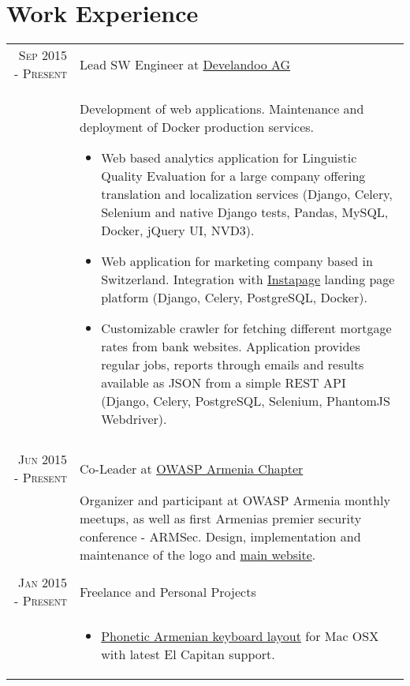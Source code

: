 \documentclass[a4paper,10pt]{article}
\begin{document}
\section{Work Experience}
\begin{tabular}{r|p{11cm}}

\textsc{Sep 2015 - Present}
  & Lead SW Engineer at
    \href{http://www.develandoo.com/}{Develandoo AG} \\

& \footnotesize{ Development of web applications. Maintenance and deployment
of Docker production services.
  \begin{itemize}
    \item Web based analytics application for Linguistic Quality Evaluation
    for a large company offering translation and localization services
    (Django, Celery, Selenium and native Django tests, Pandas, MySQL, Docker,
    jQuery UI, NVD3).
    \item Web application for marketing company based in Switzerland.
    Integration with \href{https://instapage.com/}{Instapage} landing page
    platform (Django, Celery, PostgreSQL, Docker).
    \item Customizable crawler for fetching different mortgage rates from bank
    websites. Application provides regular jobs, reports through emails and
    results available as JSON from a simple REST API (Django, Celery,
    PostgreSQL, Selenium, PhantomJS Webdriver).
  \end{itemize}
} \\


\multicolumn{2}{c}{} \\


\textsc{Jun 2015 - Present}
  & Co-Leader at
    \href{https://www.owasp.org/index.php/Armenia}{OWASP Armenia Chapter} \\

  & \footnotesize{
    Organizer and participant at OWASP Armenia monthly meetups, as well as
    first Armenia\textsc{\char13}s premier security conference - ARMSec.
    Design, implementation and maintenance of the logo and
    \href{http://armsec.org/}{main website}.
  } \\


\multicolumn{2}{c}{} \\


\textsc{Jan 2015 - Present}
  & Freelance and Personal Projects \\
  & \footnotesize{
    \begin{itemize}
      \item \href{https://github.com/vahe-evoyan/armenian-phonetic/releases}
        {Phonetic Armenian keyboard layout} for Mac OSX with latest El Capitan
        support.
    \end{itemize}
  } \\



\end{tabular}
\end{document}

